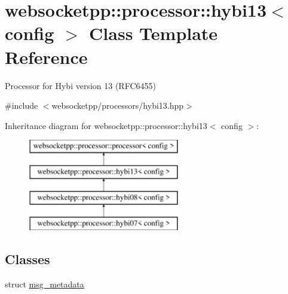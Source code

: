 \hypertarget{classwebsocketpp_1_1processor_1_1hybi13}{}\section{websocketpp\+:\+:processor\+:\+:hybi13$<$ config $>$ Class Template Reference}
\label{classwebsocketpp_1_1processor_1_1hybi13}


Processor for Hybi version 13 (R\+F\+C6455)  




{\ttfamily \#include $<$websocketpp/processors/hybi13.\+hpp$>$}

Inheritance diagram for websocketpp\+:\+:processor\+:\+:hybi13$<$ config $>$\+:\begin{figure}[H]
\begin{center}
\leavevmode
\includegraphics[height=4.000000cm]{classwebsocketpp_1_1processor_1_1hybi13}
\end{center}
\end{figure}
\subsection*{Classes}
\begin{DoxyCompactItemize}
\item 
struct \hyperlink{structwebsocketpp_1_1processor_1_1hybi13_1_1msg__metadata}{msg\+\_\+metadata}
\end{DoxyCompactItemize}
